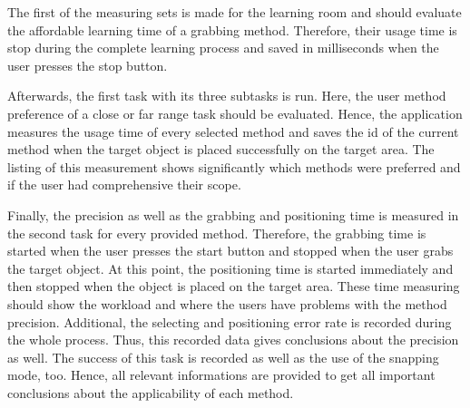 The first of the measuring sets is made for the learning room and should evaluate the affordable learning time of a grabbing method. Therefore, their usage time is stop during the complete learning process and saved in milliseconds when the user presses the stop button. 

Afterwards, the first task with its three subtasks is run. Here, the user method preference of a close or far range task should be evaluated. Hence, the application measures the usage time of every selected method and saves the id of the current method when the target object is placed successfully on the target area. The listing of this measurement shows significantly which methods were preferred and if the user had comprehensive their scope.  

Finally, the precision as well as the grabbing and positioning time is measured in the second task for every provided method. Therefore, the grabbing time is started when the user presses the start button and stopped when the user grabs the target object. At this point, the positioning time is started immediately and then stopped when the object is placed on the target area. These time measuring should show the workload and where the users have problems with the method precision. Additional, the selecting and positioning error rate is recorded during the whole process. Thus, this recorded data gives conclusions about the precision as well.  The success of this task is recorded as well as the use of the snapping mode, too. Hence, all relevant informations are provided to get all important conclusions about the applicability of each method. 


\newpage
